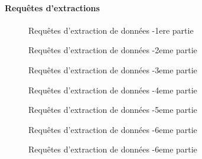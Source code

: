 \documentclass[a4paper, 11pt]{article}
\begin{document}
\paragraph*{Requêtes d'extractions}
\begin{figure}[H]
  
  \caption{Requêtes d'extraction de données -1ere partie}
  \label{fig:extraction-access}
\end{figure}
\par\bigskip
\begin{figure}[H]
  
  \caption{Requêtes d'extraction de données -2eme partie}
  \label{fig:extraction-access-2}
\end{figure}
\par\bigskip
\begin{figure}[H]
  
  \caption{Requêtes d'extraction de données -3eme partie}
  \label{fig:extraction-access-3}
\end{figure}
\par\bigskip
\begin{figure}[H]
  
  \caption{Requêtes d'extraction de données -4eme partie}
  \label{fig:extraction-access-4}
\end{figure}
\par\bigskip
\begin{figure}[H]
  
  \caption{Requêtes d'extraction de données -5eme partie}
  \label{fig:extraction-access-5}
\end{figure}
\par\bigskip
\begin{figure}[H]
  
  \caption{Requêtes d'extraction de données -6eme partie}
  \label{fig:extraction-access-6}
\end{figure}
\par\bigskip
\begin{figure}[H]
  
  \caption{Requêtes d'extraction de données -6eme partie}
  \label{fig:extraction-access-6}
\end{figure}
\end{document}
